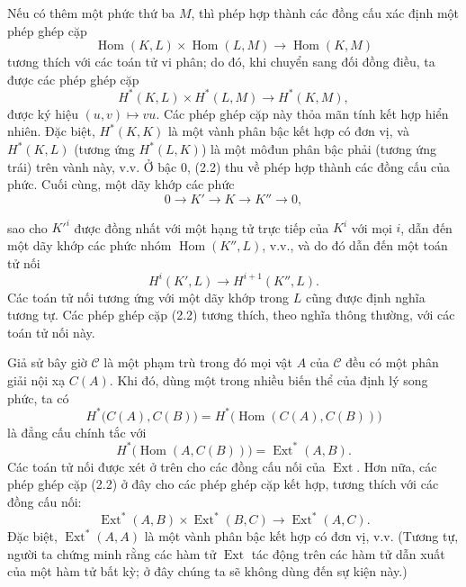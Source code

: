 \documentclass[11pt,twoside,openany]{book}
\numberwithin{equation}{section}
\newcommand{\src}[1]{%
  \phantomsection\hypertarget{src:\fgasourceid:#1}{}%
  \marginpar{\raggedleft\footnotesize\sffamily #1}%
}
\newcommand{\fgasourceid}{unset}
\newcommand{\Ccat}{\mathcal C}
\begin{document}
Nếu có thêm một phức thứ ba $M$, thì phép hợp thành các đồng cấu
xác định một phép ghép cặp
\[
  \operatorname{Hom}(K,L)\times\operatorname{Hom}(L,M)
  \longrightarrow\operatorname{Hom}(K,M)
\]
tương thích với các toán tử vi phân; do đó, khi chuyển sang đối đồng điều,
ta được các phép ghép cặp
\begin{equation}\tag{2.2}
  H^{*}(K,L)\times H^{*}(L,M)\longrightarrow H^{*}(K,M),
\end{equation}
được ký hiệu $(u,v)\longmapsto vu$. Các phép ghép cặp này thỏa mãn tính
kết hợp hiển nhiên. Đặc biệt, $H^{*}(K,K)$ là một vành phân bậc kết hợp
có đơn vị, và $H^{*}(K,L)$ (tương ứng $H^{*}(L,K)$) là một môđun phân bậc phải
(tương ứng trái) trên vành này, v.v. Ở bậc $0$, (2.2) thu về
phép hợp thành các đồng cấu của phức. Cuối cùng, một dãy khớp các
phức
\[
  0\longrightarrow K'\longrightarrow K\longrightarrow K''\longrightarrow 0,
\]

\src{172}
sao cho $K'^{i}$ được đồng nhất với một hạng tử trực tiếp của $K^{i}$ với mọi $i$,
dẫn đến một dãy khớp các phức nhóm $\operatorname{Hom}(K'',L)$, v.v., và do đó dẫn đến một
toán tử nối
\[
  H^{i}(K',L)\longrightarrow H^{i+1}(K'',L).
\]
Các toán tử nối tương ứng với một dãy khớp trong $L$ cũng được định nghĩa tương tự. Các
phép ghép cặp (2.2) tương thích, theo nghĩa thông thường, với các toán tử nối này.

Giả sử bây giờ $\Ccat$ là một phạm trù trong đó mọi vật $A$ của $\Ccat$
đều có một phân giải nội xạ $C(A)$. Khi đó, dùng một trong nhiều biến thể của định lý song phức, ta có
\[
  H^{*}\bigl(C(A),C(B)\bigr)
  =H^{*}\bigl(\operatorname{Hom}(C(A),C(B))\bigr)
\]
là đẳng cấu chính tắc với
\[
  H^{*}\bigl(\operatorname{Hom}(A,C(B))\bigr)
  =\operatorname{Ext}^{*}(A,B).
\]
Các toán tử nối được xét ở trên cho các đồng cấu nối của
$\operatorname{Ext}$. Hơn nữa, các phép ghép cặp (2.2) ở đây cho
các phép ghép cặp kết hợp, tương thích với các đồng cấu nối:
\begin{equation}\tag{2.3}
  \operatorname{Ext}^{*}(A,B)\times\operatorname{Ext}^{*}(B,C)
  \longrightarrow\operatorname{Ext}^{*}(A,C).
\end{equation}
Đặc biệt, $\operatorname{Ext}^{*}(A,A)$ là một vành phân bậc kết hợp
có đơn vị, v.v. (Tương tự, người ta chứng minh rằng các hàm tử
$\operatorname{Ext}$ tác động trên các hàm tử dẫn xuất của một hàm tử
bất kỳ; ở đây chúng ta sẽ không dùng đến sự kiện này.)
\end{document}
